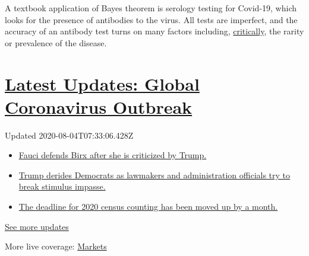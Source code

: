 A textbook application of Bayes theorem is serology testing for
Covid-19, which looks for the presence of antibodies to the virus. All
tests are imperfect, and the accuracy of an antibody test turns on many
factors including,
\href{https://www.scientificamerican.com/article/coronavirus-antibody-tests-have-a-mathematical-pitfall/}{critically},
the rarity or prevalence of the disease.

\hypertarget{latest-updates-global-coronavirus-outbreak}{%
\section{\texorpdfstring{\href{https://www.nytimes.com/2020/08/03/world/coronavirus-covid-19.html?action=click\&pgtype=Article\&state=default\&region=MAIN_CONTENT_1\&context=storylines_live_updates}{Latest
Updates: Global Coronavirus
Outbreak}}{Latest Updates: Global Coronavirus Outbreak}}\label{latest-updates-global-coronavirus-outbreak}}

Updated 2020-08-04T07:33:06.428Z

\begin{itemize}
\tightlist
\item
  \href{https://www.nytimes.com/2020/08/03/world/coronavirus-covid-19.html?action=click\&pgtype=Article\&state=default\&region=MAIN_CONTENT_1\&context=storylines_live_updates\#link-4547638f}{Fauci
  defends Birx after she is criticized by Trump.}
\item
  \href{https://www.nytimes.com/2020/08/03/world/coronavirus-covid-19.html?action=click\&pgtype=Article\&state=default\&region=MAIN_CONTENT_1\&context=storylines_live_updates\#link-15e7f995}{Trump
  derides Democrats as lawmakers and administration officials try to
  break stimulus impasse.}
\item
  \href{https://www.nytimes.com/2020/08/03/world/coronavirus-covid-19.html?action=click\&pgtype=Article\&state=default\&region=MAIN_CONTENT_1\&context=storylines_live_updates\#link-e5a2cda}{The
  deadline for 2020 census counting has been moved up by a month.}
\end{itemize}

\href{https://www.nytimes.com/2020/08/03/world/coronavirus-covid-19.html?action=click\&pgtype=Article\&state=default\&region=MAIN_CONTENT_1\&context=storylines_live_updates}{See
more updates}

More live coverage:
\href{https://www.nytimes.com/live/2020/08/03/business/stock-market-today-coronavirus?action=click\&pgtype=Article\&state=default\&region=MAIN_CONTENT_1\&context=storylines_live_updates}{Markets}

